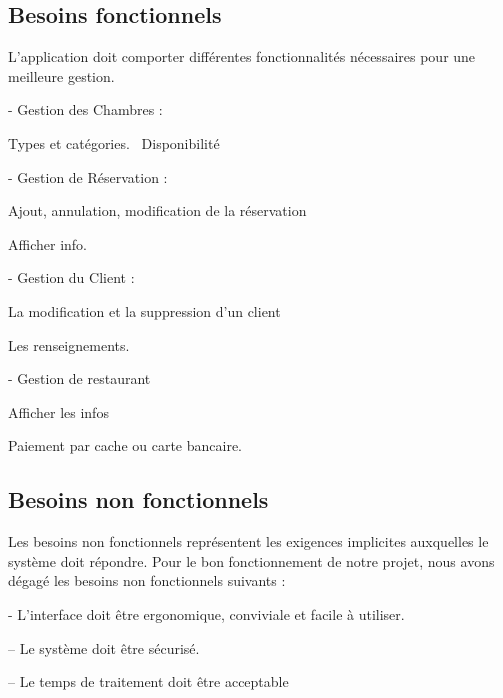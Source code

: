 \documentclass[paper=a4, fontsize=11pt]{scrartcl}
\begin{document}
\subsection{Besoins fonctionnels}

L’application doit comporter différentes fonctionnalités nécessaires pour une meilleure gestion.~\par
-	Gestion des Chambres :~\par
	Types et catégories.~
	Disponibilité~\par\par
-	Gestion de Réservation :~\par
	Ajout, annulation, modification de la réservation~\par
	Afficher info.~\par
-	Gestion du Client :~\par
	La modification et la suppression d’un client~\par
	Les renseignements.~\par
-	Gestion de restaurant~\par
	Afficher les infos~\par
	Paiement par cache ou carte bancaire.~\par 
\subsection{Besoins non fonctionnels}
Les besoins non fonctionnels représentent les exigences implicites auxquelles le système doit
répondre. Pour le bon fonctionnement de notre projet, nous avons dégagé les besoins non
fonctionnels suivants :~\par
- L’interface doit être ergonomique, conviviale et facile à utiliser.~\par
– Le système doit être sécurisé.~\par
– Le temps de traitement doit être acceptable
\end{document}
